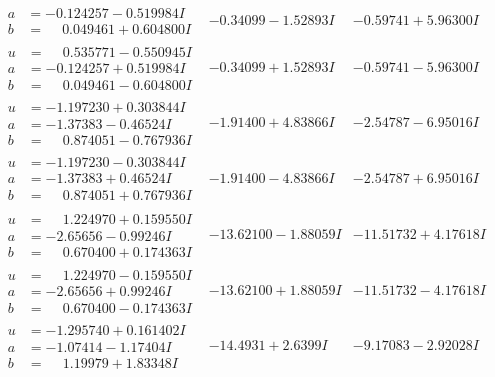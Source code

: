 \documentclass[1p]{elsarticle_modified}
\theoremstyle{definition}
\begin{document}
$$\begin{array}{c|c|c}
\begin{aligned}
a &= -0.124257 - 0.519984 I \\
b &= \phantom{-}0.049461 + 0.604800 I\end{aligned}
 & -0.34099 - 1.52893 I & -0.59741 + 5.96300 I \\ \hline\begin{aligned}
u &= \phantom{-}0.535771 - 0.550945 I \\
a &= -0.124257 + 0.519984 I \\
b &= \phantom{-}0.049461 - 0.604800 I\end{aligned}
 & -0.34099 + 1.52893 I & -0.59741 - 5.96300 I \\ \hline\begin{aligned}
u &= -1.197230 + 0.303844 I \\
a &= -1.37383 - 0.46524 I \\
b &= \phantom{-}0.874051 - 0.767936 I\end{aligned}
 & -1.91400 + 4.83866 I & -2.54787 - 6.95016 I \\ \hline\begin{aligned}
u &= -1.197230 - 0.303844 I \\
a &= -1.37383 + 0.46524 I \\
b &= \phantom{-}0.874051 + 0.767936 I\end{aligned}
 & -1.91400 - 4.83866 I & -2.54787 + 6.95016 I \\ \hline\begin{aligned}
u &= \phantom{-}1.224970 + 0.159550 I \\
a &= -2.65656 - 0.99246 I \\
b &= \phantom{-}0.670400 + 0.174363 I\end{aligned}
 & -13.62100 - 1.88059 I & -11.51732 + 4.17618 I \\ \hline\begin{aligned}
u &= \phantom{-}1.224970 - 0.159550 I \\
a &= -2.65656 + 0.99246 I \\
b &= \phantom{-}0.670400 - 0.174363 I\end{aligned}
 & -13.62100 + 1.88059 I & -11.51732 - 4.17618 I \\ \hline\begin{aligned}
u &= -1.295740 + 0.161402 I \\
a &= -1.07414 - 1.17404 I \\
b &= \phantom{-}1.19979 + 1.83348 I\end{aligned}
 & -14.4931 + 2.6399 I & -9.17083 - 2.92028 I \\ \hline\begin{aligned}

\end{aligned}
\end{array}$$
\end{document}
